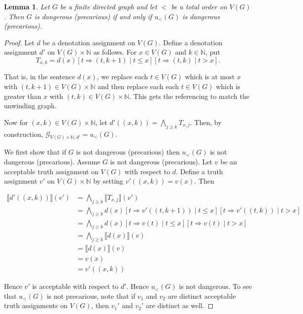 \documentclass[12pt]{kluwer}
\newtheorem{lem}[thm]{Lemma}
\theoremstyle{remark}
\newcommand{\fancy}[1]{\mathcal{#1}}
\def\G{\fancy{G}}
\begin{document}
\begin{lem}\label{UnrollingPreservesDanger}
Let $G$ be a finite directed graph and let $<$ be a total order on $V(G)$.  Then $G$ is dangerous (precarious) if and only if $u_{<}(G)$ is dangerous (precarious).
\end{lem}
\begin{proof}
Let $d$ be a denotation assignment on $V(G)$.  Define a denotation assignment $d'$ on $V(G) \times \mathbb{N}$ as follows. For $x \in V(G)$ and $k \in \mathbb{N}$, put 
\[T_{x, k} = d(x)\left[t \Rightarrow (t, k + 1) \mid t \leq x\right]\left[t \Rightarrow (t, k) \mid t > x\right].\]

That is, in the sentence $d(x)$, we replace each $t \in V(G)$ which is at most $x$ with $(t, k + 1) \in V(G) \times \mathbb{N}$ and then replace each each $t \in V(G)$ which is greater than $x$ with $(t, k) \in V(G) \times \mathbb{N}$. This gets the referencing to match the unwinding graph.\newline

Now for $(x, k) \in V(G) \times \mathbb{N}$, let $d'((x,k)) = \bigwedge_{j \geq k} T_{x, j}$. Then, by construction, $\G_{V(G) \times \mathbb{N}, d'} = u_{<}(G)$.\newline

We first show that if $G$ is not dangerous (precarious) then $u_{<}(G)$ is not dangerous (precarious). Assume $G$ is not dangerous (precarious). Let $v$ be an acceptable truth assignment on $V(G)$ with respect to $d$.  Define a truth assignment $v'$ on $V(G) \times \mathbb{N}$ by setting $v'((x, k)) = v(x)$.  Then

\begin{align*}
\llbracket d'((x,k)) \rrbracket (v') &= \bigwedge_{j \geq k}  \llbracket T_{x, j} \rrbracket (v') \\
&=  \bigwedge_{j \geq k} d(x)\left[t \Rightarrow v'((t, k + 1)) \mid t \leq x \right]\left[t \Rightarrow v'((t, k))\mid t > x\right] \\
&=  \bigwedge_{j \geq k} d(x)\left[t \Rightarrow v(t) \mid t \leq x \right]\left[t \Rightarrow v(t)\mid t > x\right] \\
&= \bigwedge_{j \geq k} \llbracket d(x) \rrbracket(v) \\
&=  \llbracket d(x) \rrbracket(v) \\
&= v(x) \\
& = v'((x, k))
\end{align*}

Hence $v'$ is acceptable with respect to $d'$.   Hence $u_{<}(G)$ is not dangerous. To see that $u_{<}(G)$ is not precarious, note that if $v_1$ and $v_2$ are distinct acceptable truth assignments on $V(G)$, then $v_1'$ and $v_2'$ are distinct as well.\newline


\end{proof}
\end{document}
